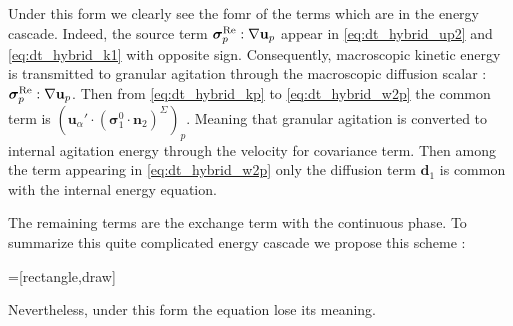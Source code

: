 Under this form we clearly see the fomr of the terms which are in the energy cascade. 
Indeed, the source term $\bm{\sigma}_p^\text{Re} :\mathbf{\nabla} \textbf{u}_p$ appear in \ref{eq:dt_hybrid_up2} and \ref{eq:dt_hybrid_k1} with opposite sign. 
Consequently, macroscopic kinetic energy is transmitted to granular agitation through the macroscopic diffusion scalar : $\bm{\sigma}_p^\text{Re} :\mathbf{\nabla} \textbf{u}_p$. 
Then from \ref{eq:dt_hybrid_kp} to \ref{eq:dt_hybrid_w2p} the common term is 
$(\textbf{u}_\alpha' \cdot (\bm{\sigma}_1^0 \cdot  \textbf{n}_2)^\Sigma)_p$. 
Meaning that granular agitation is converted to internal agitation energy through the velocity for covariance term. 
Then among the term appearing in \ref{eq:dt_hybrid_w2p} only the diffusion term $\textbf{d}_1$ is common with  the internal energy equation. 

The remaining terms are the exchange term with the continuous phase. 
To summarize this quite complicated energy cascade we propose this scheme :
\begin{center}
    =[rectangle,draw]
\end{center}
Nevertheless, under this form the equation lose its meaning. 


